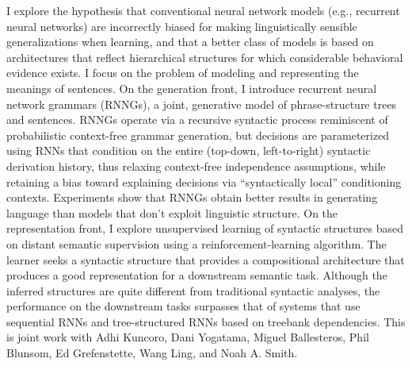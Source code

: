 I explore the hypothesis that conventional neural network models (e.g., recurrent neural networks) are incorrectly biased for making linguistically sensible generalizations when learning, and that a better class of models is based on architectures that reflect hierarchical structures for which considerable behavioral evidence exists. I focus on the problem of modeling and representing the meanings of sentences. On the generation front, I introduce recurrent neural network grammars (RNNGs), a joint, generative model of phrase-structure trees and sentences. RNNGs operate via a recursive syntactic process reminiscent of probabilistic context-free grammar generation, but decisions are parameterized using RNNs that condition on the entire (top-down, left-to-right) syntactic derivation history, thus relaxing context-free independence assumptions, while retaining a bias toward explaining decisions via ``syntactically local'' conditioning contexts. Experiments show that RNNGs obtain better results in generating language than models that don't exploit linguistic structure. On the representation front, I explore unsupervised learning of syntactic structures based on distant semantic supervision using a reinforcement-learning algorithm. The learner seeks a syntactic structure that provides a compositional architecture that produces a good representation for a downstream semantic task. Although the inferred structures are quite different from traditional syntactic analyses, the performance on the downstream tasks surpasses that of systems that use sequential RNNs and tree-structured RNNs based on treebank dependencies. This is joint work with Adhi Kuncoro, Dani Yogatama, Miguel Ballesteros, Phil Blunsom, Ed Grefenstette, Wang Ling, and Noah A. Smith.
